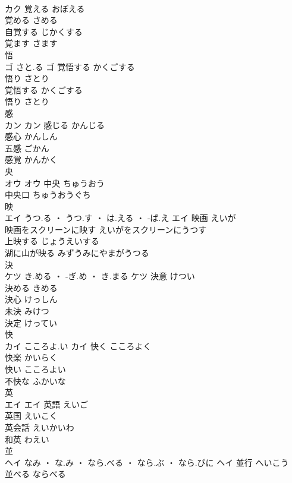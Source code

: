 \documentclass[8pt]{extreport}
\begin{document}
\begin{CJK}{UTF8}{min}
\\	カク	覚える	おぼえる	
\\	覚める	さめる	
\\	自覚する	じかくする	
\\	覚ます	さます	
\\	悟	
\\	ゴ	さと.る	ゴ	覚悟する	かくごする	
\\	悟り	さとり	
\\	覚悟する	かくごする	
\\	悟り	さとり	
\\	感	
\\	カン		カン	感じる	かんじる	
\\	感心	かんしん	
\\	五感	ごかん	
\\	感覚	かんかく	
\\	央	
\\	オウ		オウ	中央	ちゅうおう	
\\	中央口	ちゅうおうぐち	
\\	映	
\\	エイ	うつ.る ・ うつ.す ・ は.える ・ -ば.え	エイ	映画	えいが	
\\	映画をスクリーンに映す	えいがをスクリーンにうつす	
\\	上映する	じょうえいする	
\\	湖に山が映る	みずうみにやまがうつる	
\\	決	
\\	ケツ	き.める ・ -ぎ.め ・ き.まる	ケツ	決意	けつい	
\\	決める	きめる	
\\	決心	けっしん	
\\	未決	みけつ	
\\	決定	けってい	
\\	快	
\\	カイ	こころよ.い	カイ	快く	こころよく	
\\	快楽	かいらく	
\\	快い	こころよい	
\\	不快な	ふかいな	
\\	英	
\\	エイ		エイ	英語	えいご	
\\	英国	えいこく	
\\	英会話	えいかいわ	
\\	和英	わえい	
\\	並	
\\	ヘイ	なみ ・ な.み ・ なら.べる ・ なら.ぶ ・ なら.びに	ヘイ	並行	へいこう	
\\	並べる	ならべる	

\end{CJK}
\end{document}
